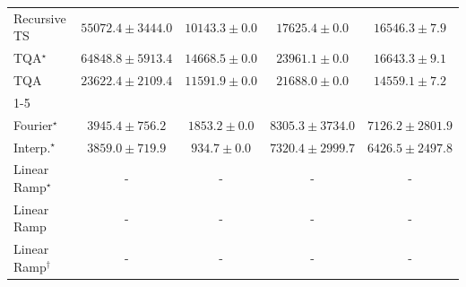 \begin{tabular}{l|cccc|}
Recursive TS & {\cellcolor[HTML]{14783E}} \color[HTML]{F1F1F1} $55072.4\pm 3444.0$ & {\cellcolor[HTML]{FFFFE5}} \color[HTML]{000000} $10143.3\pm 0.0$ & {\cellcolor[HTML]{F5FBB8}} \color[HTML]{000000} $17625.4\pm 0.0$ & {\cellcolor[HTML]{F8FCBD}} \color[HTML]{000000} $16546.3\pm 7.9$ \\
TQA$^\star$ & {\cellcolor[HTML]{004A2B}} \color[HTML]{F1F1F1} $64848.8\pm 5913.4$ & {\cellcolor[HTML]{FAFDC9}} \color[HTML]{000000} $14668.5\pm 0.0$ & {\cellcolor[HTML]{DAF0A4}} \color[HTML]{000000} $23961.1\pm 0.0$ & {\cellcolor[HTML]{F8FCBD}} \color[HTML]{000000} $16643.3\pm 9.1$ \\
TQA & {\cellcolor[HTML]{DCF1A5}} \color[HTML]{000000} $23622.4\pm 2109.4$ & {\cellcolor[HTML]{FDFEDD}} \color[HTML]{000000} $11591.9\pm 0.0$ & {\cellcolor[HTML]{E4F4AB}} \color[HTML]{000000} $21688.0\pm 0.0$ & {\cellcolor[HTML]{FAFDC9}} \color[HTML]{000000} $14559.1\pm 7.2$ \\
\cline{1-5}
\multicolumn{5}{c}{\rule{0pt}{8pt}SV} \\
\midrule
Fourier$^\star$ & {\cellcolor[HTML]{9CB9D9}} \color[HTML]{000000} $3945.4\pm 756.2$ & {\cellcolor[HTML]{EDE7F2}} \color[HTML]{000000} $1853.2\pm 0.0$ & {\cellcolor[HTML]{023C5F}} \color[HTML]{F1F1F1} $8305.3\pm 3734.0$ & {\cellcolor[HTML]{04629A}} \color[HTML]{F1F1F1} $7126.2\pm 2801.9$ \\
Interp.$^\star$ & {\cellcolor[HTML]{A1BBDA}} \color[HTML]{000000} $3859.0\pm 719.9$ & {\cellcolor[HTML]{FFF7FB}} \color[HTML]{000000} $934.7\pm 0.0$ & {\cellcolor[HTML]{045E93}} \color[HTML]{F1F1F1} $7320.4\pm 2999.7$ & {\cellcolor[HTML]{0C74B2}} \color[HTML]{F1F1F1} $6426.5\pm 2497.8$ \\
Linear Ramp$^\star$ & {\cellcolor[HTML]{000000}} \color[HTML]{F1F1F1} {\cellcolor{white}} \color{black} - & {\cellcolor[HTML]{000000}} \color[HTML]{F1F1F1} {\cellcolor{white}} \color{black} - & {\cellcolor[HTML]{000000}} \color[HTML]{F1F1F1} {\cellcolor{white}} \color{black} - & {\cellcolor[HTML]{000000}} \color[HTML]{F1F1F1} {\cellcolor{white}} \color{black} - \\
Linear Ramp & {\cellcolor[HTML]{000000}} \color[HTML]{F1F1F1} {\cellcolor{white}} \color{black} - & {\cellcolor[HTML]{000000}} \color[HTML]{F1F1F1} {\cellcolor{white}} \color{black} - & {\cellcolor[HTML]{000000}} \color[HTML]{F1F1F1} {\cellcolor{white}} \color{black} - & {\cellcolor[HTML]{000000}} \color[HTML]{F1F1F1} {\cellcolor{white}} \color{black} - \\
Linear Ramp$^\dagger$ & {\cellcolor[HTML]{000000}} \color[HTML]{F1F1F1} {\cellcolor{white}} \color{black} - & {\cellcolor[HTML]{000000}} \color[HTML]{F1F1F1} {\cellcolor{white}} \color{black} - & {\cellcolor[HTML]{000000}} \color[HTML]{F1F1F1} {\cellcolor{white}} \color{black} - & {\cellcolor[HTML]{000000}} \color[HTML]{F1F1F1} {\cellcolor{white}} \color{black} - \\

\end{tabular}
